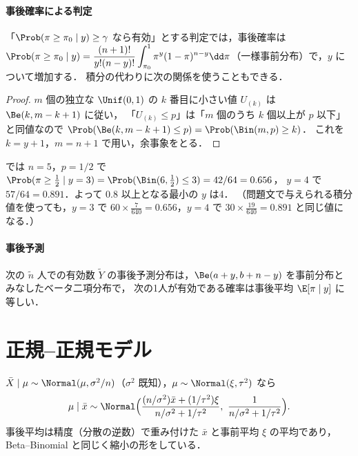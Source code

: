 \paragraph{事後確率による判定}
「$\Prob(\pi\ge\pi_0\mid y)\ge\gamma$ なら有効」とする判定では，事後確率は
$\Prob(\pi\ge\pi_0\mid y)=\dfrac{(n+1)!}{y!(n-y)!}\displaystyle\int_{\pi_0}^1\pi^y(1-\pi)^{n-y}\dd\pi$（一様事前分布）で，$y$ について増加する．
積分の代わりに次の関係を使うこともできる．
\begin{proof}
$m$ 個の独立な $\Unif(0,1)$ の $k$ 番目に小さい値 $U_{(k)}$ は $\Be(k,m-k+1)$ に従い，
「$U_{(k)}\le p$」は「$m$ 個のうち $k$ 個以上が $p$ 以下」と同値なので $\Prob(\Be(k,m-k+1)\le p)=\Prob(\Bin(m,p)\ge k)$．
これを $k=y+1$，$m=n+1$ で用い，余事象をとる．
\end{proof}
 では $n=5$，$p=1/2$ で $\Prob(\pi\ge\frac12\mid y=3)=\Prob(\Bin(6,\tfrac12)\le3)=42/64=0.656$，
$y=4$ で $57/64=0.891$．よって $0.8$ 以上となる最小の $y$ は4．
（問題文で与えられる積分値を使っても，$y=3$ で $60\times\frac{7}{640}=0.656$，$y=4$ で $30\times\frac{19}{640}=0.891$ と同じ値になる．）

\paragraph{事後予測}
次の $\tilde n$ 人での有効数 $\tilde Y$ の事後予測分布は，$\Be(a+y,b+n-y)$ を事前分布とみなしたベータ二項分布で，
次の1人が有効である確率は事後平均 $\E[\pi\mid y]$ に等しい．

\section{正規--正規モデル}\label{sec:17-normal}
$\bar X\mid\mu\sim\Normal(\mu,\sigma^2/n)$（$\sigma^2$ 既知），$\mu\sim\Normal(\xi,\tau^2)$ なら
\[
\mu\mid\bar x\sim\Normal\Bigl(\frac{(n/\sigma^2)\bar x+(1/\tau^2)\xi}{n/\sigma^2+1/\tau^2},\ \frac{1}{n/\sigma^2+1/\tau^2}\Bigr).
\]
事後平均は精度（分散の逆数）で重み付けた $\bar x$ と事前平均 $\xi$ の平均であり，Beta--Binomial と同じく縮小の形をしている．


